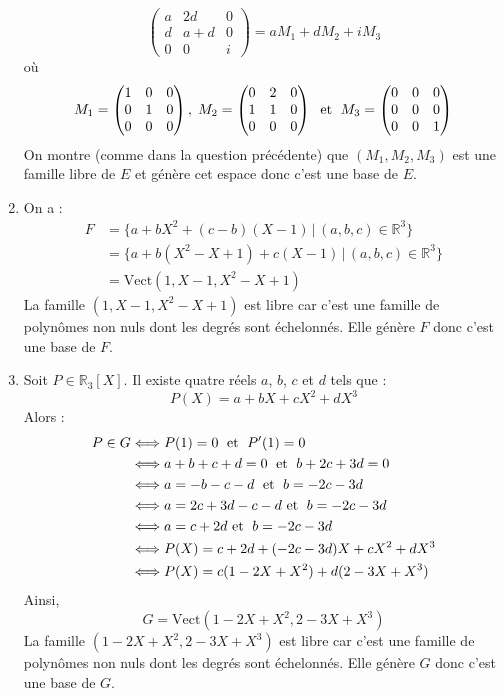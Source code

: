 \documentclass[a4paper,10pt]{report}
\begin{document}
\begin{enumerate}
$$\begin{pmatrix}
a & 2d & 0 \\
d & a+d & 0 \\
0 & 0 & i
\end{pmatrix} = a M_1+ d M_2+i M_3$$
où 
$$ M_1 = \begin{pmatrix}
1 & 0 & 0 \\
0 & 1 & 0 \\
0 & 0 & 0
\end{pmatrix}, \; M_2 = \begin{pmatrix}
0 & 2 & 0 \\
1 & 1& 0 \\
0 & 0 & 0
\end{pmatrix} \; \hbox{ et } \; M_3 = \begin{pmatrix}
0 & 0 & 0 \\
0 & 0& 0 \\
0 & 0 & 1
\end{pmatrix}$$
On montre (comme dans la question précédente) que $(M_1,M_2,M_3)$ est une famille libre de $E$ et génère cet espace donc c'est une base de $E$.
\item On a :
\begin{align*}
F & = \lbrace a + bX^2 + (c-b)(X-1) \, \vert \, (a,b,c) \in \mathbb{R}^3 \rbrace \\
& = \lbrace a + b(X^2-X+1)+ c (X-1) \, \vert \, (a,b,c) \in \mathbb{R}^3 \rbrace \\ 
& = \textrm{Vect}(1,X-1,X^2-X+1)
\end{align*}
La famille $(1,X-1,X^2-X+1)$ est libre car c'est une famille de polynômes non nuls dont les degrés sont échelonnés. Elle génère $F$ donc c'est une base de $F$.
\item Soit $P \in \mathbb{R}_3[X]$. Il existe quatre réels $a$, $b$, $c$ et $d$ tels que :
$$ P(X) = a +bX+cX^2+dX^3$$
Alors :
\begin{align*}
P \in G & \Longleftrightarrow P(1)=0 \; \hbox{ et } \; P'(1)=0 \\
& \Longleftrightarrow a+b+c+d = 0 \; \hbox{ et } \; b+2c+3d = 0 \\
& \Longleftrightarrow a=-b-c-d \; \hbox{ et } \; b=-2c-3d \\
& \Longleftrightarrow a = 2c+3d-c-d  \hbox{ et } \; b=-2c-3d \\
& \Longleftrightarrow a = c +2d \hbox{ et } \; b=-2c-3d \\
& \Longleftrightarrow P(X) = c+2d + (-2c-3d)X + c X^2 + dX^3 \\
& \Longleftrightarrow P(X) = c (1-2X+X^2)+ d (2-3X+X^3)
\end{align*}
Ainsi,
$$ G = \textrm{Vect}(1-2X+X^2,2-3X+X^3)$$
La famille $(1-2X+X^2,2-3X+X^3)$ est libre car c'est une famille de polynômes non nuls dont les degrés sont échelonnés. Elle génère $G$ donc c'est une base de $G$.
\end{enumerate}
\end{document}
